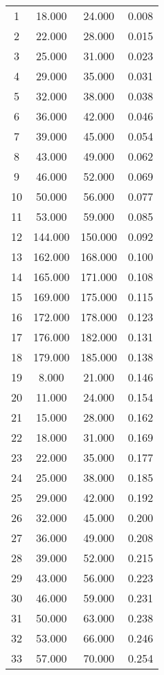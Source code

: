 % 
\begin{tabular}{cccc}
  \hline
  \hline
1 & 18.000 & 24.000 & 0.008 \\ 
  2 & 22.000 & 28.000 & 0.015 \\ 
  3 & 25.000 & 31.000 & 0.023 \\ 
  4 & 29.000 & 35.000 & 0.031 \\ 
  5 & 32.000 & 38.000 & 0.038 \\ 
  6 & 36.000 & 42.000 & 0.046 \\ 
  7 & 39.000 & 45.000 & 0.054 \\ 
  8 & 43.000 & 49.000 & 0.062 \\ 
  9 & 46.000 & 52.000 & 0.069 \\ 
  10 & 50.000 & 56.000 & 0.077 \\ 
  11 & 53.000 & 59.000 & 0.085 \\ 
  12 & 144.000 & 150.000 & 0.092 \\ 
  13 & 162.000 & 168.000 & 0.100 \\ 
  14 & 165.000 & 171.000 & 0.108 \\ 
  15 & 169.000 & 175.000 & 0.115 \\ 
  16 & 172.000 & 178.000 & 0.123 \\ 
  17 & 176.000 & 182.000 & 0.131 \\ 
  18 & 179.000 & 185.000 & 0.138 \\ 
  19 & 8.000 & 21.000 & 0.146 \\ 
  20 & 11.000 & 24.000 & 0.154 \\ 
  21 & 15.000 & 28.000 & 0.162 \\ 
  22 & 18.000 & 31.000 & 0.169 \\ 
  23 & 22.000 & 35.000 & 0.177 \\ 
  24 & 25.000 & 38.000 & 0.185 \\ 
  25 & 29.000 & 42.000 & 0.192 \\ 
  26 & 32.000 & 45.000 & 0.200 \\ 
  27 & 36.000 & 49.000 & 0.208 \\ 
  28 & 39.000 & 52.000 & 0.215 \\ 
  29 & 43.000 & 56.000 & 0.223 \\ 
  30 & 46.000 & 59.000 & 0.231 \\ 
  31 & 50.000 & 63.000 & 0.238 \\ 
  32 & 53.000 & 66.000 & 0.246 \\ 
  33 & 57.000 & 70.000 & 0.254 \\ 

\end{tabular}
